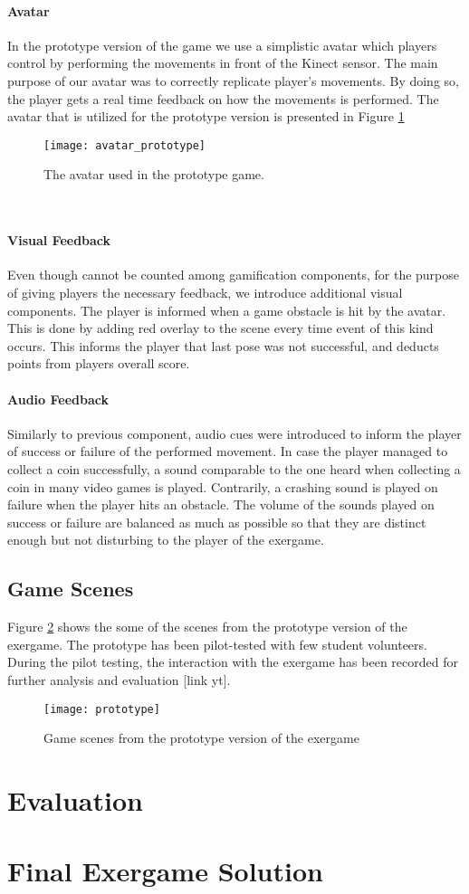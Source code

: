 \paragraph{Avatar}
In the prototype version of the game we use a simplistic avatar which players control by performing the movements in front of the Kinect sensor. The main purpose of our avatar was to correctly replicate player's movements. By doing so, the player gets a real time feedback on how the movements is performed. The avatar that is utilized for the prototype version is presented in Figure \ref{fig:avatar_prototype}
\begin{figure}[h]
    \centering
    \texttt{[image: avatar\_prototype]}
    \caption{The avatar used in the prototype game.}
    \label{fig:avatar_prototype}
\end{figure}\\
\paragraph{Visual Feedback}
Even though cannot be counted among gamification components, for the purpose of giving players the necessary feedback, we introduce additional visual components. The player is informed when a game obstacle is hit by the avatar. This is done by adding red overlay to the scene every time event of this kind occurs. This informs the player that last pose was not successful, and deducts points from players overall score.
\paragraph{Audio Feedback}
Similarly to previous component, audio cues were introduced to inform the player of success or failure of the performed movement. In case the player managed to collect a coin successfully, a sound comparable to the one heard when collecting a coin in many video games is played. Contrarily, a crashing sound is played on failure when the player hits an obstacle. The volume of the sounds played on success or failure are balanced as much as possible so that they are distinct enough but not disturbing to the player of the exergame.
\subsection{Game Scenes}
Figure \ref{fig:prototype} shows the some of the scenes from the prototype version of the exergame. The prototype has been pilot-tested with few student volunteers. During the pilot testing, the interaction with the exergame has been recorded for further analysis and evaluation [link yt]. 
\begin{figure}[h]
    \centering
    \texttt{[image: prototype]}
    \caption{Game scenes from the prototype version of the exergame}
    \label{fig:prototype}
\end{figure}
\section{Evaluation}
\section{Final Exergame Solution}